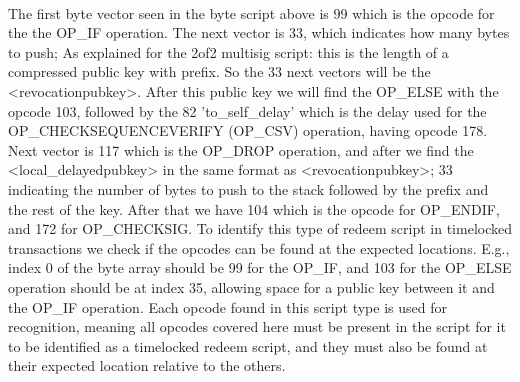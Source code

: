 \\

The first byte vector seen in the byte script above is 99 which is the opcode for the the OP\_IF operation. The next vector is 33, which indicates how many bytes to push; As explained for the 2of2 multisig script: this is the length of a compressed public key with prefix. So the 33 next vectors will be the <revocationpubkey>. After this public key we will find the OP\_ELSE with the opcode 103, followed by the 82 'to\_self\_delay' which is the delay used for the OP\_CHECKSEQUENCEVERIFY (OP\_CSV) operation, having opcode 178. 
Next vector is 117 which is the OP\_DROP operation, and after we find the <local\_delayedpubkey> in the same format as <revocationpubkey>; 33 indicating the number of bytes to push to the stack followed by the prefix and the rest of the key. After that we have 104 which is the opcode for OP\_ENDIF, and 172 for OP\_CHECKSIG.
To identify this type of redeem script in timelocked transactions we check if the opcodes can be found at the expected locations. E.g., index 0 of the byte array should be 99 for the OP\_IF, and 103 for the OP\_ELSE operation should be at index 35, allowing space for a public key between it and the OP\_IF operation. Each opcode found in this script type is used for recognition, meaning all opcodes covered here must be present in the script for it to be identified as a timelocked redeem script, and they must also be found at their expected location relative to the others.
\\

